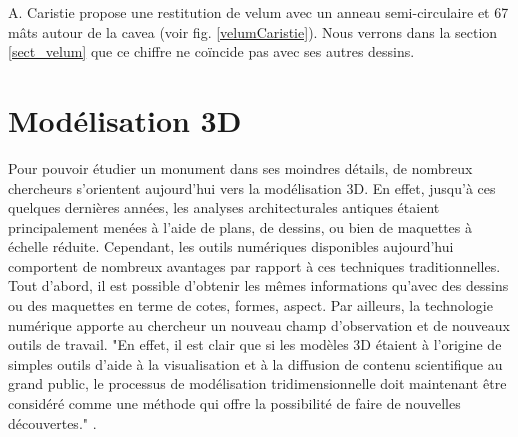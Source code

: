 		A. Caristie propose une restitution de \gls{velum} avec un anneau semi-circulaire et 67 mâts autour de la \gls{cavea} (voir fig. \ref{velumCaristie}). Nous verrons dans la section \ref{sect_velum} que ce chiffre ne coïncide pas avec ses autres dessins.
		














\chapter{Modélisation 3D}
		\minitoc
		\newpage
		
		Pour pouvoir étudier un monument dans ses moindres détails, de nombreux chercheurs s'orientent aujourd'hui vers la modélisation 3D. En effet, jusqu'à ces quel\-ques dernières années, les analyses architecturales antiques étaient principalement menées à l'aide de plans, de dessins, ou bien de maquettes à échelle réduite. Cependant, les outils numériques disponibles aujourd'hui comportent de nombreux avantages par rapport à ces techniques traditionnelles. Tout d'abord, il est possible d'obtenir les mêmes informations qu'avec des dessins ou des maquettes en terme de cotes, formes, aspect. Par ailleurs, la technologie numérique apporte au chercheur un nouveau champ d'observation et de nouveaux outils de travail. "En effet, il est clair que si les modèles 3D étaient à l’origine de simples outils d’aide à la visualisation et à la diffusion de contenu scientifique au grand public, le processus de modélisation tridimensionnelle doit maintenant être considéré comme une méthode qui offre la possibilité de faire de nouvelles découvertes." \cite[p. 246]{rocheleau}.
		
